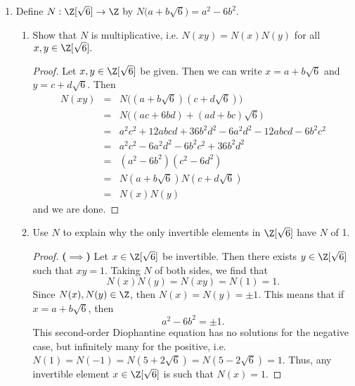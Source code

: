 \documentclass[letterpaper]{article}
\begin{document}
\begin{enumerate}
\begin{enumerate}[label=\alph*.]
\begin{proof}
\[\begin{array}{rcl}
   		k&=&3a+b\\
   		&=&3(3b)+b\\
   		&=&10b\\
    	\end{array}\]
			Therefore, $\ker\phi\subseteq10\Z$. 
    \end{proof}
  	\item By FHT, $$\Z/10\Z=\Z_{10}\cong\Z[i]/\langle3-i\rangle,$$ so $\langle3-i\rangle$ is not prime.
  	\begin{proof}
  		If $\langle3-i\rangle$ were prime, then $\Z[i]/\langle3-i\rangle$ would be an integral domain. However, $\Z_{10}$ has zero divisors ($2\times5=0$), so neither ring is an integral domain, so $\langle3-i\rangle$ is not prime.
  	\end{proof}
  \end{enumerate}
	\pagebreak  
  \item Define $N:\Z[\sqrt{6}]\to\Z$ by $N\big(a+b\sqrt{6}\big) = a^2-6b^2.$
  \begin{enumerate}[label=\alph*.]
  	\item Show that $N$ is multiplicative, i.e. $N(xy)=N(x)N(y)$ for all $x,y\in\Z[\sqrt{6}].$
  	\begin{proof}
  		Let $x,y\in\Z[\sqrt{6}]$ be given. Then we can write $x=a+b\sqrt{6}$ and $y=c+d\sqrt{6}$. Then 
  		\[\begin{array}{rcl}
  			N(xy)&=&N\big((a+b\sqrt{6})(c+d\sqrt{6})\big)\\
  			&=&N\big((ac+6bd)+(ad+bc)\sqrt{6}\big)\\
  			&=&a^2c^2+12abcd+36b^2d^2 - 6a^2d^2-12abcd-6b^2c^2\\
  			&=&a^2c^2-6a^2d^2-6b^2c^2+36b^2d^2\\
  			&=&(a^2-6b^2)(c^2-6d^2)\\
  			&=&N(a+b\sqrt{6})N(c+d\sqrt{6})\\
  			&=&N(x)N(y)
  		\end{array}\]
  		and we are done.
  	\end{proof}
  	\item Use $N$ to explain why the only invertible elements in $\Z[\sqrt{6}]$ have $N$ of 1.
  	\begin{proof}\textbf{($\implies$)}
  		Let $x\in\Z[\sqrt{6}]$ be invertible. Then there exists $y\in\Z[\sqrt{6}]$ such that $xy=1$. Taking $N$ of both sides, we find that
  		$$N(x)N(y)=N(xy)=N(1)=1.$$
  		Since $N(x),N(y)\in\Z$, then $N(x)=N(y)=\pm1$. This means that if $x=a+b\sqrt{6}$, then 
  		$$a^2-6b^2=\pm1.$$
  		This second-order Diophantine equation has no solutions for the negative case, but infinitely many for the positive, i.e. $N(1)=N(-1)=N(5+2\sqrt6)=N(5-2\sqrt6)=1$. Thus, any invertible element $x\in\Z[\sqrt{6}]$ is such that $N(x)=1$. 

\end{proof}
\end{enumerate}
\end{enumerate}
\end{document}
